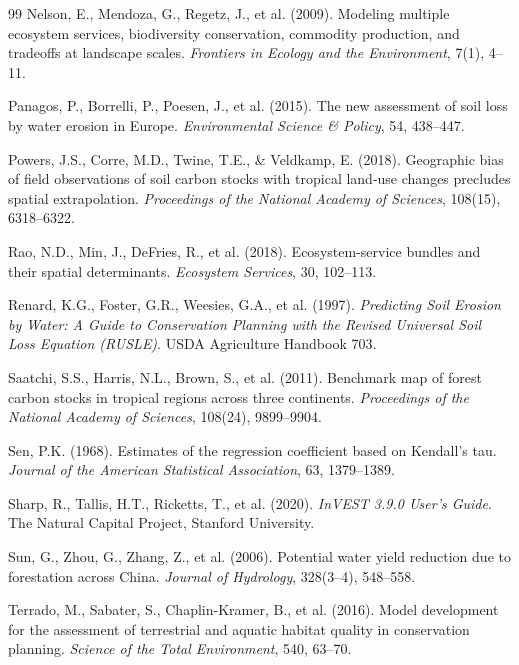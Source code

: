 \documentclass[12pt,a4paper]{article}
\begin{document}
\begin{thebibliography}{99}
Nelson, E., Mendoza, G., Regetz, J., et al. (2009).
Modeling multiple ecosystem services, biodiversity conservation,
commodity production, and tradeoffs at landscape scales.
\textit{Frontiers in Ecology and the Environment}, 7(1), 4--11.

Panagos, P., Borrelli, P., Poesen, J., et al. (2015).
The new assessment of soil loss by water erosion in Europe.
\textit{Environmental Science \& Policy}, 54, 438--447.

Powers, J.S., Corre, M.D., Twine, T.E., \& Veldkamp, E. (2018).
Geographic bias of field observations of soil carbon stocks with
tropical land-use changes precludes spatial extrapolation.
\textit{Proceedings of the National Academy of Sciences}, 108(15),
6318--6322.

Rao, N.D., Min, J., DeFries, R., et al. (2018).
Ecosystem-service bundles and their spatial determinants.
\textit{Ecosystem Services}, 30, 102--113.

Renard, K.G., Foster, G.R., Weesies, G.A., et al. (1997).
\textit{Predicting Soil Erosion by Water: A Guide to Conservation
Planning with the Revised Universal Soil Loss Equation (RUSLE)}.
USDA Agriculture Handbook 703.

Saatchi, S.S., Harris, N.L., Brown, S., et al. (2011).
Benchmark map of forest carbon stocks in tropical regions across
three continents.
\textit{Proceedings of the National Academy of Sciences}, 108(24),
9899--9904.

Sen, P.K. (1968).
Estimates of the regression coefficient based on Kendall's tau.
\textit{Journal of the American Statistical Association}, 63,
1379--1389.

Sharp, R., Tallis, H.T., Ricketts, T., et al. (2020).
\textit{InVEST 3.9.0 User's Guide}.
The Natural Capital Project, Stanford University.

Sun, G., Zhou, G., Zhang, Z., et al. (2006).
Potential water yield reduction due to forestation across China.
\textit{Journal of Hydrology}, 328(3--4), 548--558.

Terrado, M., Sabater, S., Chaplin-Kramer, B., et al. (2016).
Model development for the assessment of terrestrial and aquatic
habitat quality in conservation planning.
\textit{Science of the Total Environment}, 540, 63--70.


\end{thebibliography}
\end{document}
